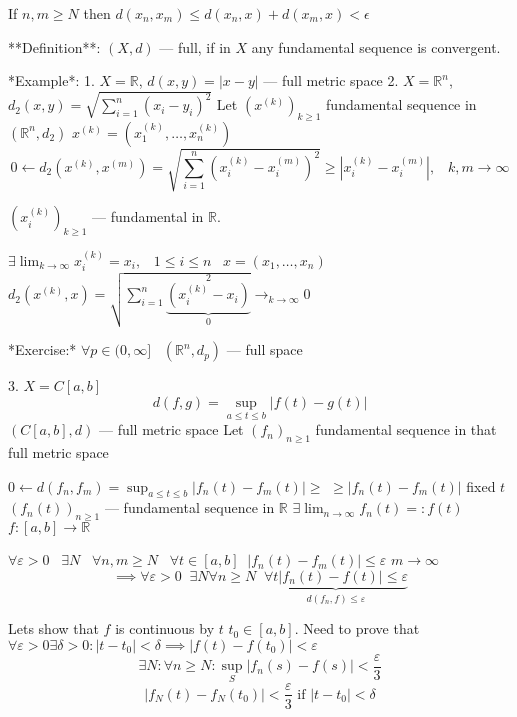 If $n,m \geq N$ then $d(x_{n}, x_{m}) \leq d(x_{n}, x) + d(x_{m}, x) < \epsilon$


**Definition**:
$(X, d)$ — full, if in $X$ any fundamental sequence is convergent.

*Example*:
1. $X = \mathbb{R}$, $d(x,y) = \left| x - y \right|$ — full metric space
2. $X = \mathbb{R}^{n}$, $d_{2}(x,y) = \sqrt{ \sum_{i=1}^{n}(x_{i} - y_{i})^{2} }$
Let $(x^{(k)})_{k \geq 1}$ fundamental sequence in $(\mathbb{R}^{n}, d_{2})$
$x^{(k)} = \left( x^{(k)}_{1}, \dots, x^{(k)}_{n} \right)$
$$
0 \leftarrow d_{2}(x^{(k)}, x^{(m)}) = \sqrt{ \sum_{i=1}^{n}(x^{(k)}_{i} - x^{(m)}_{i})^{2} }
 \geq \left| x^{(k)} _{i} - x^{(m)}_{i} \right| , \;\;\; k,m \to \infty
$$

$(x^{(k)}_{i})_{k \geq 1}$ — fundamental in $\mathbb{R}$.

$\exists \lim_{ k \to \infty } x^{(k)}_{i} = x_{i},\;\;\; 1 \leq i \leq n \;\;\; x = (x_{1}, \dots, x_{n})$
$d_{2}(x^{(k)}, x) = \sqrt{ \sum_{i=1}^{n} \underbrace{(x^{(k)}_{i} - x_{i})}_{0}^{2} } \to_{k \to \infty} 0$

*Exercise:* $\forall p \in (0, \infty] \;\;\; (\mathbb{R}^{n}, d_{p})$ — full space

3. $X = C[a,b]$
$$d(f,g) = \sup_{a \leq t \leq b} \left| f(t) - g(t) \right|$$
$(C[a,b], d)$ — full metric space
Let $(f_{n})_{n \geq 1}$ fundamental sequence in that full metric space

$0 \leftarrow d(f_{n}, f_{m}) = \sup_{a \leq t \leq b} \left| f_{n}(t) - f_{m}(t) \right| \geq$
$\geq \left| f_{n}(t) - f_{m}(t) \right|$
fixed $t$
$(f_{n}(t))_{n \geq 1}$ — fundamental sequence in $\mathbb{R}$
$\exists \lim_{ n \to \infty }f_{n}(t) =: f(t)$
$f: [a,b] \to \mathbb{R}$


$\forall \varepsilon > 0 \;\;\; \exists N \;\;\; \forall n,m \geq N \;\;\; \forall t \in [a,b] \;\; \left| f_{n}(t) - f_{m}(t) \right| \leq \varepsilon$
$m \to \infty$
$$\implies \forall \varepsilon > 0 \;\; \exists N \forall n \geq N \;\; \underbrace{\forall t \left| f_{n}(t) - f(t) \right| \leq \varepsilon}_{d(f_{n}, f) \leq \varepsilon}$$


Lets show that $f$ is continuous by $t$ 
$t_0 \in  [a,b]$. 
Need to prove that $\forall \varepsilon > 0 \exists \delta > 0 : \left| t - t_0 \right| < \delta \implies \left| f(t) - f(t_0)  \right| < \varepsilon$
\[ \exists N : \forall n \ge N : \sup_S \left| f_n(s) - f(s) \right| < \frac{\varepsilon}{3}  \] 
\[ \left|f_{N}(t) - f_{N}(t_0) \right| < \frac{\varepsilon}{3} \text{ if } \left| t -t_0  \right| < \delta  \] 

